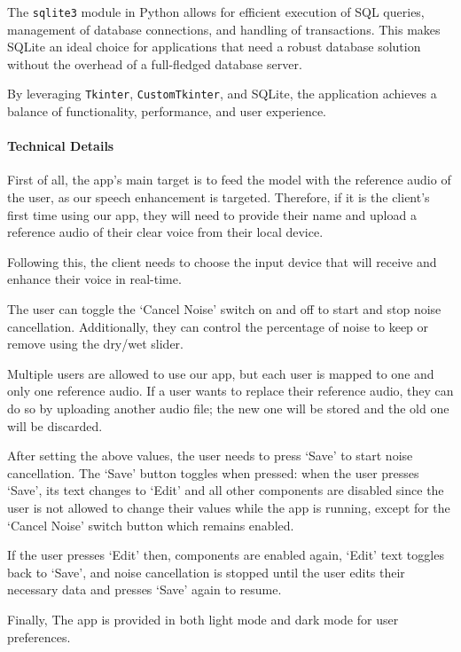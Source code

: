 The \texttt{sqlite3} module in Python allows for efficient execution of SQL queries, management of database connections, and handling of transactions. This makes SQLite an ideal choice for applications that need a robust database solution without the overhead of a full-fledged database server.

By leveraging \texttt{Tkinter}, \texttt{CustomTkinter}, and SQLite, the application achieves a balance of functionality, performance, and user experience.

\paragraph{Technical Details} 

\vspace{-1em}

First of all, the app’s main target is to feed the model with the reference audio of the user, as our speech enhancement is targeted. Therefore, if it is the client's first time using our app, they will need to provide their name and upload a reference audio of their clear voice from their local device. 

Following this, the client needs to choose the input device that will receive and enhance their voice in real-time.

The user can toggle the ‘Cancel Noise’ switch on and off to start and stop noise cancellation. Additionally, they can control the percentage of noise to keep or remove using the dry/wet slider.

Multiple users are allowed to use our app, but each user is mapped to one and only one reference audio. If a user wants to replace their reference audio, they can do so by uploading another audio file; the new one will be stored and the old one will be discarded. 

After setting the above values, the user needs to press ‘Save’ to start noise cancellation. The ‘Save’ button toggles when pressed: when the user presses ‘Save’, its text changes to ‘Edit’ and all other components are disabled since the user is not allowed to change their values while the app is running, except for the ‘Cancel Noise’ switch button which remains enabled.

If the user presses ‘Edit’ then, components are enabled again, ‘Edit’ text toggles back to ‘Save’, and noise cancellation is stopped until the user edits their necessary data and presses ‘Save’ again to resume.

Finally, The app is provided in both light mode and dark mode for user preferences.

